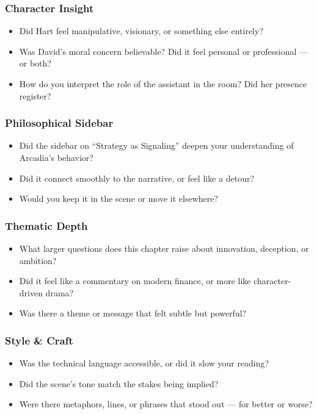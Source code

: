 \subsubsection{Character Insight}

\begin{itemize}
  \item Did Hart feel manipulative, visionary, or something else entirely?
  \item Was David’s moral concern believable? Did it feel personal or professional — or both?
  \item How do you interpret the role of the assistant in the room? Did her presence register?
\end{itemize}

\subsubsection{Philosophical Sidebar}

\begin{itemize}
  \item Did the sidebar on ``Strategy as Signaling'' deepen your understanding of Arcadia’s behavior?
  \item Did it connect smoothly to the narrative, or feel like a detour?
  \item Would you keep it in the scene or move it elsewhere?
\end{itemize}

\subsubsection{Thematic Depth}

\begin{itemize}
  \item What larger questions does this chapter raise about innovation, deception, or ambition?
  \item Did it feel like a commentary on modern finance, or more like character-driven drama?
  \item Was there a theme or message that felt subtle but powerful?
\end{itemize}

\subsubsection{Style \& Craft}

\begin{itemize}
  \item Was the technical language accessible, or did it slow your reading?
  \item Did the scene’s tone match the stakes being implied?
  \item Were there metaphors, lines, or phrases that stood out — for better or worse?
\end{itemize}

